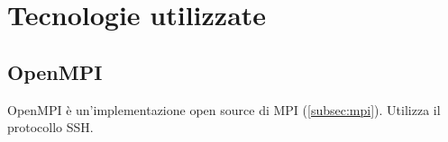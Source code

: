 \section{Tecnologie utilizzate}
\label{sec:tecnologie}

\subsection{OpenMPI}
\label{subsec:openmpi}
OpenMPI è un'implementazione open source di MPI (\ref{subsec:mpi}).
Utilizza il protocollo SSH. %